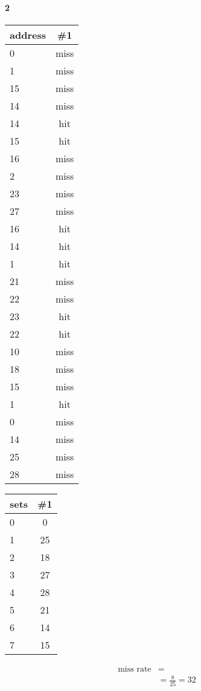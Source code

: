 \documentclass[11pt]{article}
\begin{document}
\paragraph{2}
\begin{center}
	\begin{tabular}{l || c}
		address & \#1 \\
		\hline
		0  & miss \\
		1  & miss \\
		15 & miss \\
		14 & miss \\
		14 & hit  \\
		15 & hit  \\
		16 & miss \\
		2  & miss \\
		23 & miss \\
		27 & miss \\
		16 & hit  \\
		14 & hit  \\
		1  & hit  \\
		21 & miss \\
		22 & miss \\
		23 & hit  \\
		22 & hit  \\
		10 & miss \\
		18 & miss \\
		15 & miss \\
		1  & hit  \\
		0  & miss \\
		14 & miss \\
		25 & miss \\
		28 & miss \\
	\end{tabular}
	\begin{tabular}{l || c}
		sets & \#1 \\
		\hline
		0 & 0  \\
		1 & 25 \\
		2 & 18 \\
		3 & 27 \\
		4 & 28 \\
		5 & 21 \\
		6 & 14 \\
		7 & 15 \\
	\end{tabular}
	\begin{align*}
		\text{miss rate} &= \\
		&= \frac{8}{25} = 32%
	\end{align*}
\end{center}
\end{document}
